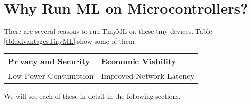 \documentclass[../../main]{subfiles}
\begin{document}
\section{Why Run ML on Microcontrollers?} \label{sec:}

There are several reasons to run TinyML on these tiny devices. Table
\ref{tbl:advantagesTinyML} show some of them.

\begin{center}
    \begin{tabularx} {\textwidth} {
            >{\centering \arraybackslash}X
            >{\centering \arraybackslash}X
        }
        \toprule
        \midrule

        Privacy and Security & Economic Viability \\
        \midrule
        Low Power Consumption & Improved Network Latency \\

        \midrule
        \bottomrule

    \end{tabularx}

    \label{tbl:advantagesTinyML}

\end{center}

We will see each of these in detail in the following sections.
\end{document}
